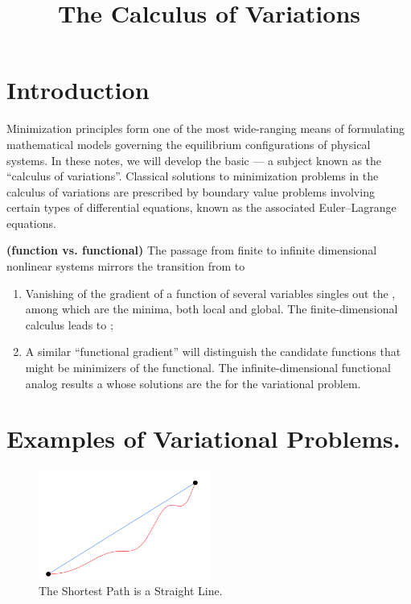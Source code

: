 \documentclass{article}
\title{The Calculus of Variations}
\newcommand{\bfs}[1]{\textbf{({#1}) }}
\begin{document}
\maketitle
\section{Introduction}
Minimization principles form one of the most wide-ranging means of formulating mathematical models governing the equilibrium conﬁgurations of physical systems. In these notes, we will develop the basic  — a subject known as the “calculus of variations”. Classical solutions to minimization problems in the calculus of variations are prescribed by boundary value problems involving certain types of diﬀerential equations, known as the associated Euler–Lagrange equations.

\begin{rema}\bfs{function vs. functional} The passage from ﬁnite to infinite dimensional nonlinear systems mirrors the transition from  to 
\begin{enumerate}
    \item Vanishing of the gradient of a function of several variables singles out the , among which are the minima, both local and global. The finite-dimensional calculus leads to ;
    \item A similar “functional gradient” will distinguish the candidate functions that might be minimizers of the functional. The infinite-dimensional functional analog results a  whose solutions are the  for the variational problem.
\end{enumerate}
\end{rema}
\section{Examples of Variational Problems.}
\begin{figure}[ht]
    \centering
    \includegraphics[width=0.5\textwidth]{Figs/a1.png}
    \caption{The Shortest Path is a Straight Line.}
    \label{fig:shortest path1}
\end{figure}
\end{document}
